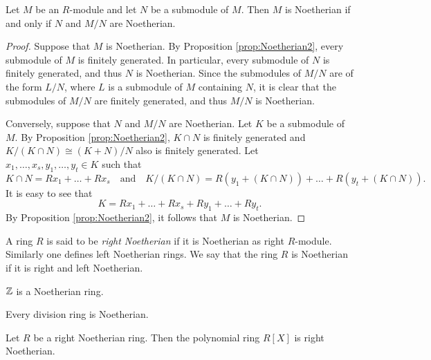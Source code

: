 \begin{corollary}\label{cor:Noetherian3}
Let $M$ be an $R$-module and let $N$ be a submodule of $M$. Then $M$ is Noetherian if and only if $N$ and $M/N$ are Noetherian.
\end{corollary}

\begin{proof}
Suppose that $M$ is Noetherian. By Proposition \ref{prop:Noetherian2}, every submodule of $M$ is finitely generated. In particular, every submodule of $N$ is finitely generated, and thus $N$ is Noetherian. Since the submodules of $M/N$ are of the form $L/N$, where $L$ is a submodule of $M$ containing $N$, it is clear that the submodules of $M/N$ are finitely generated, and thus $M/N$ is Noetherian.

Conversely, suppose that $N$ and $M/N$ are Noetherian. Let $K$ be a submodule of $M$. By Proposition \ref{prop:Noetherian2}, $K\cap N$ is finitely generated and $K/(K\cap N)\cong (K+N)/N$ also is finitely generated. Let $x_1,\dots ,x_s,y_1,\dots ,y_t\in K$ such that
\[K\cap N=Rx_1+\dots +Rx_s\quad\text{and}\quad K/(K\cap N)=R(y_1+(K\cap N))+\dots +R(y_t+(K\cap N)).\]
It is easy to see that
\[K=Rx_1+\dots +Rx_s+Ry_1+\dots +Ry_t.\]
By Proposition \ref{prop:Noetherian2}, it follows that $M$ is Noetherian.
\end{proof}

A ring $R$ is said to be \emph{right Noetherian} if it is Noetherian as right $R$-module.
Similarly one defines left Noetherian rings. We say that the ring $R$ is Noetherian if it is right and left Noetherian.

\begin{example}
$\mathbb{Z}$ is a Noetherian ring.
\end{example}

\begin{example}
Every division ring is Noetherian.
\end{example}

\begin{theorem}\label{thm:Noetherian4}
Let $R$ be a right Noetherian ring. Then the polynomial ring $R[X]$ is right Noetherian.
\end{theorem}

